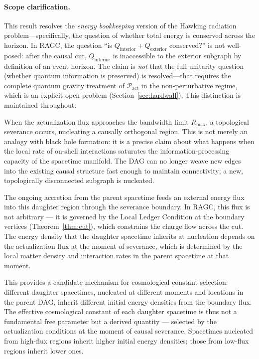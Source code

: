 \documentclass[11pt,a4paper]{article}
\theoremstyle{plain}
\theoremstyle{definition}
\theoremstyle{remark}
\newcommand{\Pact}{\mathcal{P}_{\mathrm{act}}}
\newcommand{\Rmax}{R_{\mathrm{max}}}
\begin{document}
\paragraph{Scope clarification.}
This result resolves the \emph{energy bookkeeping} version of the Hawking
radiation problem---specifically, the question of whether total energy is conserved
across the horizon. In RAGC, the question ``is $Q_{\mathrm{interior}} +
Q_{\mathrm{exterior}}$ conserved?'' is not well-posed: after the causal cut,
$Q_{\mathrm{interior}}$ is inaccessible to the exterior subgraph by definition of
an event horizon. The claim is \emph{not} that the full unitarity question (whether
quantum information is preserved) is resolved---that requires the complete quantum
gravity treatment of $\Pact$ in the non-perturbative regime, which is an explicit
open problem (Section~\ref{sec:hardwall}). This distinction is maintained
throughout.

When the actualization flux approaches the bandwidth limit $\Rmax$, a topological
severance occurs, nucleating a causally orthogonal region. This is not merely an
analogy with black hole formation: it is a precise claim about what happens when
the local rate of on-shell interactions saturates the information-processing
capacity of the spacetime manifold. The DAG can no longer weave new edges into the
existing causal structure fast enough to maintain connectivity; a new, topologically
disconnected subgraph is nucleated.

The ongoing accretion from the parent spacetime feeds an external energy flux into
this daughter region through the severance boundary. In RAGC, this flux is not
arbitrary --- it is governed by the Local Ledger Condition at the boundary vertices
(Theorem~\ref{thm:cut}), which constrains the charge flow across the cut. The
energy density that the daughter spacetime inherits at nucleation depends on the
actualization flux at the moment of severance, which is determined by the local
matter density and interaction rates in the parent spacetime at that moment.

This provides a candidate mechanism for cosmological constant selection: different
daughter spacetimes, nucleated at different moments and locations in the parent
DAG, inherit different initial energy densities from the boundary flux. The
effective cosmological constant of each daughter spacetime is thus not a
fundamental free parameter but a derived quantity --- selected by the actualization
conditions at the moment of causal severance. Spacetimes nucleated from high-flux
regions inherit higher initial energy densities; those from low-flux regions
inherit lower ones.
\end{document}
